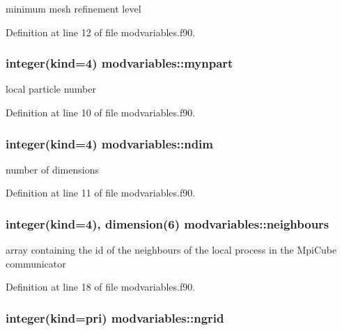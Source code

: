 minimum mesh refinement level 



Definition at line 12 of file modvariables.\-f90.

\hypertarget{classmodvariables_a6b2f4aac9da282a26d2ff36628fa0c7b}{
\subsubsection[{mynpart}]{\setlength{\rightskip}{0pt plus 5cm}integer(kind=4) modvariables\-::mynpart}}\label{classmodvariables_a6b2f4aac9da282a26d2ff36628fa0c7b}


local particle number 



Definition at line 10 of file modvariables.\-f90.

\hypertarget{classmodvariables_a8047c27f346b34f664c6e5fc6a862d84}{
\subsubsection[{ndim}]{\setlength{\rightskip}{0pt plus 5cm}integer(kind=4) modvariables\-::ndim}}\label{classmodvariables_a8047c27f346b34f664c6e5fc6a862d84}


number of dimensions 



Definition at line 11 of file modvariables.\-f90.

\hypertarget{classmodvariables_ad84b74b636d64be51d7aba857b4b5c05}{
\subsubsection[{neighbours}]{\setlength{\rightskip}{0pt plus 5cm}integer(kind=4), dimension(6) modvariables\-::neighbours}}\label{classmodvariables_ad84b74b636d64be51d7aba857b4b5c05}


array containing the id of the neighbours of the local process in the Mpi\-Cube communicator 



Definition at line 18 of file modvariables.\-f90.

\hypertarget{classmodvariables_afeecc1a4b626f4eb8e48767dbf41d0a2}{
\subsubsection[{ngrid}]{\setlength{\rightskip}{0pt plus 5cm}integer(kind=pri) modvariables\-::ngrid}}\label{classmodvariables_afeecc1a4b626f4eb8e48767dbf41d0a2}


